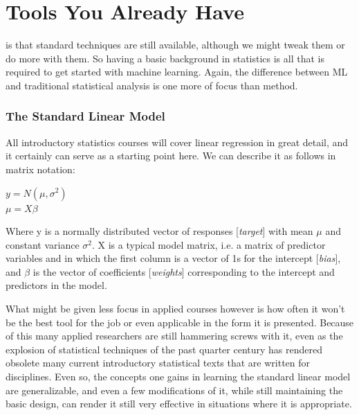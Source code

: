 \documentclass[english,nohyper,titlepage]{tufte-handout}\usepackage{knitr}
\begin{document}




\part{Tools You Already Have}

 is that standard techniques are still available, although we might tweak them or do more with them.  So having a basic background in statistics is all that is required to get started with machine learning.  Again, the difference between ML and traditional statistical analysis is one more of focus than method.

\section{The Standard Linear Model}
All introductory statistics courses will cover linear regression in great detail, and it certainly can serve as a starting point here.  We can describe it as follows in matrix notation:

\vspace{1cm}
\noindent$y = N(\mu,\sigma^{2})$\\
\noindent$\mu = X\beta$
\vspace{.25cm}

Where y is a normally distributed vector of responses [\emph{target}] with mean $\mu$ and constant variance $\sigma^{2}$.  X is a typical model matrix, i.e. a matrix of predictor variables and in which the first column is a vector of 1s for the intercept [\emph{bias}], and $\beta$ is the vector of coefficients [\emph{weights}] corresponding to the intercept and predictors in the model.

What might be given less focus in applied courses however is how often it won't be the best tool for the job or even applicable in the form it is presented.  Because of this many applied researchers are still hammering screws with it, even as the explosion of statistical techniques of the past quarter century has rendered obsolete many current introductory statistical texts that are written for disciplines.  Even so, the concepts one gains in learning the standard linear model are generalizable, and even a few modifications of it, while still maintaining the basic design, can render it still very effective in situations where it is appropriate.
\end{document}
